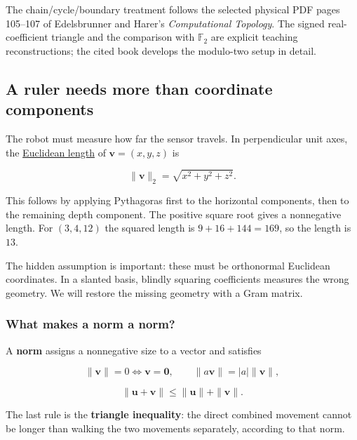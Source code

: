 The chain/cycle/boundary treatment follows the selected physical PDF pages 105--107 of Edelsbrunner and Harer's \emph{Computational Topology}. The signed real-coefficient triangle and the comparison with \(\mathbb F_2\) are explicit teaching reconstructions; the cited book develops the modulo-two setup in detail.

\subsection{A ruler needs more than coordinate components}\label{01-foundations-i-ch017-a-ruler-needs-more-than-coordinate-components}

\hypertarget{01-foundations-i-ch017-a-ruler-needs-more-than-coordinate-components}{}

The robot must measure how far the sensor travels. In perpendicular unit axes, the \hyperref[01-foundations-i-ch017-a-ruler-needs-more-than-coordinate-components]{Euclidean length} of \(\mathbf v=(x,y,z)\) is

\[
\|\mathbf v\|_2=\sqrt{x^2+y^2+z^2}.
\]

This follows by applying Pythagoras first to the horizontal components, then to the remaining depth component. The positive square root gives a nonnegative length. For \((3,4,12)\) the squared length is \(9+16+144=169\), so the length is \(13\).

The hidden assumption is important: these must be orthonormal Euclidean coordinates. In a slanted basis, blindly squaring coefficients measures the wrong geometry. We will restore the missing geometry with a Gram matrix.

\subsubsection{What makes a norm a norm?}\label{01-foundations-i-ch017-what-makes-a-norm-a-norm}

\hypertarget{01-foundations-i-ch017-what-makes-a-norm-a-norm}{}

A \textbf{norm} assigns a nonnegative size to a vector and satisfies

\[
\|\mathbf v\|=0\iff\mathbf v=\mathbf0,\qquad
\|a\mathbf v\|=|a|\|\mathbf v\|,
\]

\[
\|\mathbf u+\mathbf v\|\le\|\mathbf u\|+\|\mathbf v\|.
\]

The last rule is the \textbf{triangle inequality}: the direct combined movement cannot be longer than walking the two movements separately, according to that norm.

